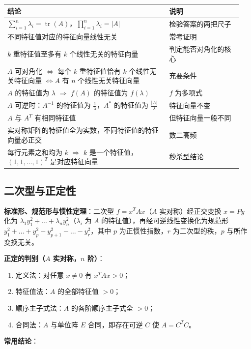 \documentclass[11pt,openany,UTF8]{ctexbook}
\begin{document}
\begingroup\small\setlength{\tabcolsep}{4.0pt}
\begin{longtable}{@{}L{0.6482\linewidth}L{0.2975\linewidth}@{}}
\toprule
\textbf{结论} & \textbf{说明} \\
\midrule
\endhead
$\sum_{i=1}^{n}\lambda_i=\operatorname{tr}(A)$，$\prod_{i=1}^{n}\lambda_i=\lvert A\rvert$ & 检验答案的两把尺子 \\
不同特征值对应的特征向量线性无关 & 常考证明 \\
$k$ 重特征值至多有 $k$ 个线性无关的特征向量 & 判定能否对角化的核心 \\
$A$ 可对角化 $\iff$ 每个 $k$ 重特征值恰有 $k$ 个线性无关特征向量 $\iff A$ 有 $n$ 个线性无关特征向量 & 充要条件 \\
$A$ 的特征值为 $\lambda$ $\Rightarrow$ $f(A)$ 的特征值为 $f(\lambda)$ & $f$ 为多项式 \\
$A$ 可逆时：$A^{-1}$ 的特征值为 $\frac1\lambda$，$A^*$ 的特征值为 $\frac{\lvert A\rvert}{\lambda}$ & 特征向量不变 \\
$A$ 与 $A^T$ 有相同特征值 & 但特征向量一般不同 \\
实对称矩阵的特征值全为实数，不同特征值的特征向量必正交 & 数二高频 \\
每行元素之和均为 $k$ $\Rightarrow$ $k$ 是一个特征值，$(1,1,\dots,1)^T$ 是对应特征向量 & 秒杀型结论 \\
\bottomrule
\end{longtable}
\endgroup

\subsection{二次型与正定性}

\textbf{标准形、规范形与惯性定理}：二次型 $f=x^TAx$（$A$ 实对称）经正交变换 $x=Py$ 化为 $\lambda_1y_1^2+\dots+\lambda_ny_n^2$（$\lambda_i$ 为 $A$ 的特征值），再经可逆线性变换化为规范形 $y_1^2+\dots+y_p^2-y_{p+1}^2-\dots-y_{r}^2$，其中 $p$ 为正惯性指数，$r$ 为二次型的秩，$p$ 与所作变换无关。

\textbf{正定的判别（$A$ 实对称，$n$ 阶）}：

\begin{enumerate}
\item 定义法：对任意 $x\ne0$ 有 $x^TAx>0$；
\item 特征值法：$A$ 的全部特征值 $>0$；
\item 顺序主子式法：$A$ 的各阶顺序主子式全 $>0$；
\item 合同法：$A$ 与单位阵 $E$ 合同，即存在可逆 $C$ 使 $A=C^TC$。
\end{enumerate}
\textbf{常用结论}：
\end{document}
